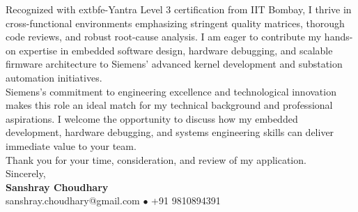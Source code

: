 \documentclass[10pt,a4paper]{article}%
\begin{document}
\noindent Recognized with 	extbf{e-Yantra Level 3 certification from IIT Bombay}, I thrive in cross-functional environments emphasizing stringent quality matrices, thorough code reviews, and robust root-cause analysis. I am eager to contribute my hands-on expertise in embedded software design, hardware debugging, and scalable firmware architecture to Siemens' advanced kernel development and substation automation initiatives. \vspace{8pt}\\

\noindent Siemens's commitment to engineering excellence and technological innovation makes this role an ideal match for my technical background and professional aspirations. I welcome the opportunity to discuss how my embedded development, hardware debugging, and systems engineering skills can deliver immediate value to your team. \vspace{8pt}\\%

\noindent Thank you for your time, consideration, and review of my application. \vspace{18pt}\\%

\noindent Sincerely, \vspace{8pt}\\%
\textbf{Sanshray Choudhary} \\%
sanshray.choudhary@gmail.com $\bullet$ +91 9810894391 \\%
\end{document}
